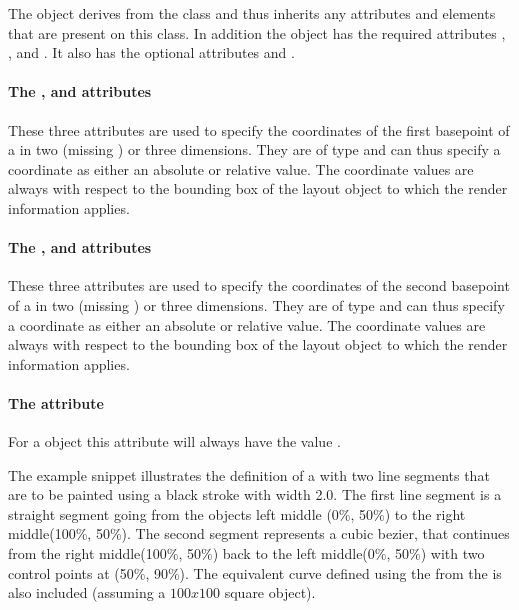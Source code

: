 The \RenderCubicBezier object derives from the \RenderPoint class and
thus inherits any attributes and elements that are present on this
class.
In addition the \RenderCubicBezier object has the required attributes , ,  and . It also has the optional attributes  and .

\paragraph{The \fixttspace{}, \fixttspace{} and \fixttspace{} attributes}

These three attributes are used to specify the coordinates of the first basepoint of a \RenderCubicBezier in two (missing ) or three dimensions. They are of type \RelAbsVector and can thus specify a coordinate as either an absolute or relative value. The coordinate
values are always with respect to the bounding box of the layout object to which the
render information applies.


\paragraph{The \fixttspace{}, \fixttspace{} and \fixttspace{} attributes}

These three attributes are used to specify the coordinates of the second basepoint of a \RenderCubicBezier in two (missing ) or three dimensions. They are of type \RelAbsVector and can thus specify a coordinate as either an absolute or relative value. The coordinate
values are always with respect to the bounding box of the layout object to which the
render information applies.

\paragraph{The \fixttspace{} attribute}

For a \RenderCubicBezier object this attribute will always have the value .



The example snippet illustrates the definition of a \RenderCurve with two line segments 
that are to be painted using a black stroke with width 2.0.
The first line segment is a straight segment going from the objects left middle (0\%, 50\%) 
to the right middle(100\%, 50\%). The second segment represents a cubic bezier, that 
continues from the right middle(100\%, 50\%) back to the left middle(0\%, 50\%) with 
two control points at (50\%, 90\%).  The equivalent curve defined using the  from the \LayoutPackage is also included (assuming a $100 x 100$ square object).


